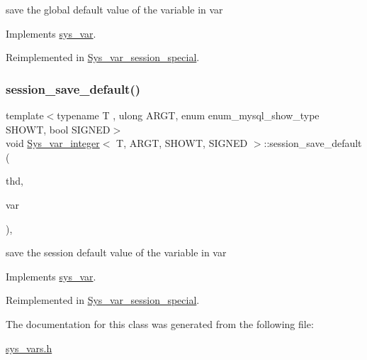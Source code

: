 save the global default value of the variable in var 

Implements \mbox{\hyperlink{classsys__var}{sys\+\_\+var}}.



Reimplemented in \mbox{\hyperlink{classSys__var__session__special_aae482b58f68b85585c41527fcb71c7d9}{Sys\+\_\+var\+\_\+session\+\_\+special}}.

\mbox{\label{classSys__var__integer_aed46d5a98789b087a079ff51f1d6a9a7}} 
\subsubsection{\texorpdfstring{session\+\_\+save\+\_\+default()}{session\_save\_default()}}
{\footnotesize\ttfamily template$<$typename T , ulong A\+R\+GT, enum enum\+\_\+mysql\+\_\+show\+\_\+type S\+H\+O\+WT, bool S\+I\+G\+N\+ED$>$ \\
void \mbox{\hyperlink{classSys__var__integer}{Sys\+\_\+var\+\_\+integer}}$<$ T, A\+R\+GT, S\+H\+O\+WT, S\+I\+G\+N\+ED $>$\+::session\+\_\+save\+\_\+default (\begin{DoxyParamCaption}\item[{T\+HD $\ast$}]{thd,  }\item[{\mbox{\hyperlink{classset__var}{set\+\_\+var}} $\ast$}]{var }\end{DoxyParamCaption})\hspace{0.3cm}{\ttfamily [inline]}, {\ttfamily [virtual]}}

save the session default value of the variable in var 

Implements \mbox{\hyperlink{classsys__var}{sys\+\_\+var}}.



Reimplemented in \mbox{\hyperlink{classSys__var__session__special_a1a685de0cd05c6161889034e899178b2}{Sys\+\_\+var\+\_\+session\+\_\+special}}.



The documentation for this class was generated from the following file\+:\begin{DoxyCompactItemize}
\item 
\mbox{\hyperlink{sys__vars_8h}{sys\+\_\+vars.\+h}}\end{DoxyCompactItemize}
